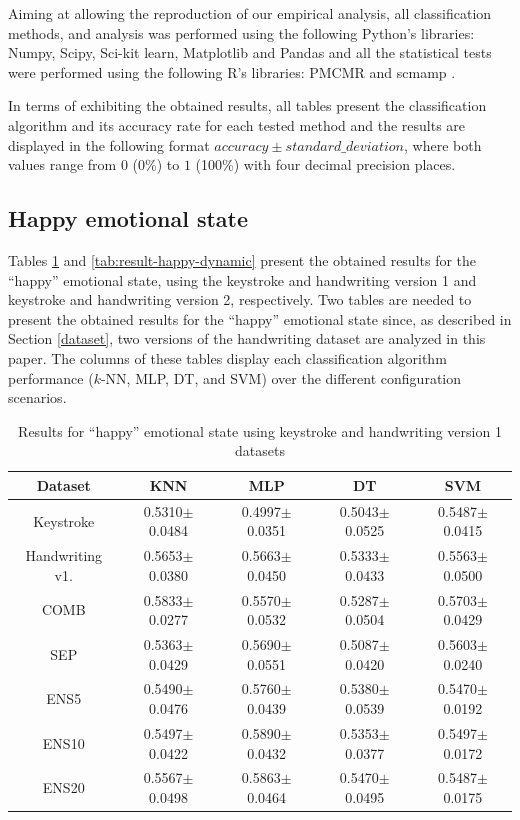 \documentclass[conference]{IEEEtran}
\begin{document}
Aiming at allowing the reproduction of our empirical analysis, all classification methods, and analysis was performed using the following Python’s libraries: Numpy, Scipy, Sci-kit learn, Matplotlib and  Pandas  \cite{numpy, scipy, sklearn, matplotlib, pandas} and all the statistical tests were performed using the following  R’s libraries:  PMCMR and scmamp \cite{PMCMR, scmamp}. 

In terms of exhibiting the obtained results, all tables present the classification algorithm and its accuracy rate for each tested method and the results are displayed in the following format $accuracy\pm standard\_deviation$, where both values range from $0$ (0\%) to $1$ (100\%) with four decimal precision places.

\subsection{Happy emotional state}
\label{results-happy}

Tables \ref{tab:result-happy-full} and \ref{tab:result-happy-dynamic} present the obtained results for the ``happy'' emotional state,  using the keystroke and handwriting version 1 and keystroke and handwriting version 2, respectively. Two tables are needed to present the obtained results for the ``happy'' emotional state since, as described in Section \ref{dataset}, two versions of the handwriting dataset are analyzed in this paper. The columns of these tables display each classification algorithm performance ($k$-NN, MLP, DT, and SVM) over the different configuration scenarios.

\begin{table}
    \centering
    \caption{Results for ``happy'' emotional state  using keystroke and handwriting version 1 datasets}
    \label{tab:result-happy-full}
    \begin{tabular}{|c|c|c|c|c|}
\hline
\textbf{Dataset}          & \textbf{KNN}        & \textbf{MLP}        & \textbf{DT}         & \textbf{SVM}        \\ \hline
Keystroke            & 0.5310$\pm$0.0484 & 0.4997$\pm$0.0351 & 0.5043$\pm$0.0525 & 0.5487$\pm$0.0415 \\ \hline
Handwriting v1. & 0.5653$\pm$0.0380 & 0.5663$\pm$0.0450 & 0.5333$\pm$0.0433 & 0.5563$\pm$0.0500 \\ \hline
COMB                  & 0.5833$\pm$0.0277 & 0.5570$\pm$0.0532 & 0.5287$\pm$0.0504 & 0.5703$\pm$0.0429 \\ \hline
SEP                & 0.5363$\pm$0.0429 & 0.5690$\pm$0.0551 & 0.5087$\pm$0.0420 & 0.5603$\pm$0.0240 \\ \hline
ENS5  & 0.5490$\pm$0.0476 & 0.5760$\pm$0.0439 & 0.5380$\pm$0.0539 & 0.5470$\pm$0.0192 \\ \hline
ENS10 & 0.5497$\pm$0.0422 & 0.5890$\pm$0.0432 & 0.5353$\pm$0.0377 & 0.5497$\pm$0.0172 \\ \hline
ENS20 & 0.5567$\pm$0.0498 & 0.5863$\pm$0.0464 & 0.5470$\pm$0.0495 & 0.5487$\pm$0.0175 \\ \hline
\end{tabular}%
\end{table} 
\end{document}
